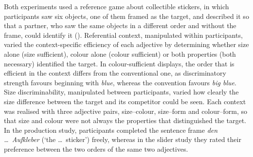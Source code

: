 \documentclass[10pt,a4paper,fleqn]{article}
\begin{document}
Both experiments used a reference game about collectible stickers, in which participants saw six objects, one of them framed as the target, and described it so that a partner, who saw the same objects in a different order and without the frame, could identify it ().
Referential context, manipulated within participants, varied the context-specific efficiency of each adjective by determining whether size alone (size sufficient), colour alone (colour sufficient) or both properties (both necessary) identified the target.
In colour-sufficient displays, the order that is efficient in the context differs from the conventional one, as discriminatory strength favours beginning with \emph{blue}, whereas the convention favours \emph{big blue}.
Size discriminability, manipulated between participants, varied how clearly the size difference between the target and its competitor could be seen.
Each context was realised with three adjective pairs, size--colour, size--form and colour--form, so that size and colour were not always the properties that distinguished the target.
In the production study, participants completed the sentence frame \emph{den \ldots\ Aufkleber} (`the \ldots\ sticker') freely, whereas in the slider study they rated their preference between the two orders of the same two adjectives.
\end{document}

